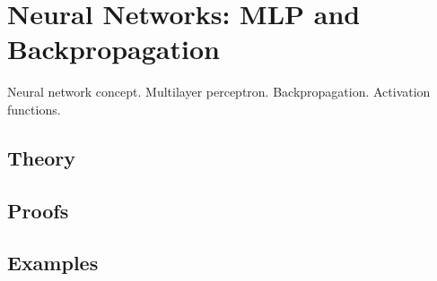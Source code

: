 
\section{Neural Networks: MLP and Backpropagation}
\label{sec:1.4.10-mlp-backprop}

\begin{ticket}
Neural network concept. Multilayer perceptron. Backpropagation. Activation functions.
\end{ticket}

\subsection*{Theory}

\subsection*{Proofs}

\subsection*{Examples}
